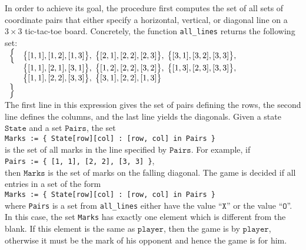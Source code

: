 \begin{enumerate}
      In order to achieve its goal, the procedure first computes the set of all sets of coordinate pairs that 
      either specify a horizontal, vertical, or diagonal line on a $3 \times 3$ tic-tac-toe board.  Concretely,
      the function \texttt{all\_lines} returns the following set:
      \\[0.2cm]
      \hspace*{1.3cm}
      $
      \begin{array}{ll}
      \Bigl\{ & \bigl\{[1, 1], [1, 2], [1, 3]\bigr\}, \;
                \bigl\{[2, 1], [2, 2], [2, 3]\bigr\}, \;
                \bigl\{[3, 1], [3, 2], [3, 3]\bigr\},   \\
              & \bigl\{[1, 1], [2, 1], [3, 1]\bigr\}, \;
                \bigl\{[1, 2], [2, 2], [3, 2]\bigr\}, \;
                \bigl\{[1, 3], [2, 3], [3, 3]\bigr\},   \\
              & \bigl\{[1, 1], [2, 2], [3, 3]\bigr\}, \;
                \bigl\{[3, 1], [2, 2], [1, 3]\bigr\}    \\
      \Bigr\}
      \end{array}
      $
      \\[0.2cm]
      The first line in this expression gives the set of pairs defining the rows, the second line defines 
      the columns, and the last line yields the diagonals.  Given a state $\texttt{State}$ and a set
      $\texttt{Pairs}$, the set 
      \\[0.2cm]
      \hspace*{1.3cm}
      \texttt{Marks := \{ State[row][col] : [row, col] in Pairs \}}
      \\[0.2cm]
      is the set of all marks in the line specified by $\texttt{Pairs}$.  For example, if 
      \\[0.2cm]
      \hspace*{1.3cm}
      \texttt{Pairs := \{ [1, 1], [2, 2], [3, 3] \}},
      \\[0.2cm]
      then $\texttt{Marks}$ is the set of marks on the falling diagonal.
      The game is decided if all entries in a set of the form 
      \\[0.2cm]
      \hspace*{1.3cm}
      \texttt{Marks := \{ State[row][col] : [row, col] in Pairs \}}
      \\[0.2cm]
      where \texttt{Pairs} is a set from \texttt{all\_lines} either have the value
      ``$\texttt{X}$'' or the value ``$\texttt{O}$''.  In this case, the set \texttt{Marks} has exactly one
      element which is different from the blank.  If this element is the same as $\texttt{player}$, then the
      game is  by $\texttt{player}$, otherwise it must be the mark of his opponent and hence the game
      is  for him. 


\end{enumerate}
